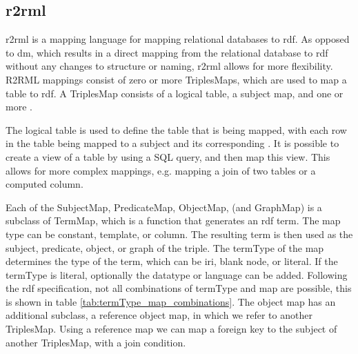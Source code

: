\subsection{\acrshort{r2rml}}
\acrfull{r2rml} is a mapping language for mapping relational databases to \acrshort{rdf}. As opposed to \acrfull{dm}, which results in a direct mapping from the relational database to \acrshort{rdf} without any changes to structure or naming, \acrshort{r2rml} allows for more flexibility. R2RML mappings consist of zero or more TriplesMaps, which are used to map a table to \acrshort{rdf}. A TriplesMap consists of a logical table, a subject map, and one or more . 

The logical table is used to define the table that is being mapped, with each row in the table being mapped to a subject and its corresponding . It is possible to create a view of a table by using a SQL query, and then map this view. This allows for more complex mappings, e.g. mapping a join of two tables or a computed column. 


Each of the SubjectMap, PredicateMap, ObjectMap, (and GraphMap) is a subclass of TermMap, which is a function that generates an \acrshort{rdf} term. The map type can be constant, template, or column. The resulting term is then used as the subject, predicate, object, or graph of the triple. The termType of the map determines the type of the term, which can be \acrshort{iri}, blank node, or literal. If the termType is literal, optionally the datatype or language can be added. Following the \acrshort{rdf} specification, not all combinations of termType and map are possible, this is shown in table \ref{tab:termType_map_combinations}. The object map has an additional subclass, a reference object map, in which we refer to another TriplesMap. Using a reference map we can map a foreign key to the subject of another TriplesMap, with a join condition. \citep{r2rml}

